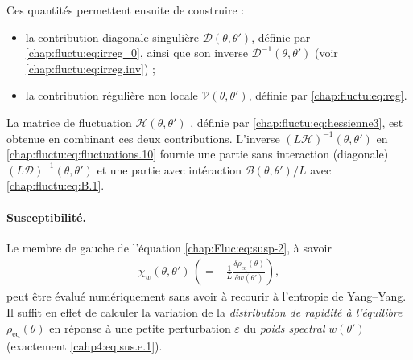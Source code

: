 Ces quantités permettent ensuite de construire :
\begin{itemize}[label = $\bullet$]
	\item la contribution diagonale singulière \( \mathcal{D}(\theta, \theta') \), définie par \eqref{chap:fluctu:eq:irreg_0}, ainsi que son inverse \( \mathcal{D}^{-1}(\theta, \theta') \) (voir \eqref{chap:fluctu:eq:irreg.inv}) ;	
	\item la contribution régulière non locale \( \mathcal{V}(\theta, \theta') \), définie par \eqref{chap:fluctu:eq:reg}.
\end{itemize}

La matrice de fluctuation \( \mathcal{H}(\theta, \theta') \)  , définie par \eqref{chap:fluctu:eq:hessienne3}, est obtenue en combinant ces deux contributions. L’inverse \( \left(L \mathcal{H} \right)^{-1}(\theta, \theta') \) en \eqref{chap:fluctu:eq:fluctuations.10} fournie une partie sans interaction (diagonale) $(L\mathcal{D})^{-1}(\theta, \theta')$ et une partie avec intéraction $\mathcal{B}(\theta, \theta')/L$ avec \eqref{chap:fluctu:eq:B.1}.


%

\paragraph{Susceptibilité.}

Le membre de gauche de l’équation \eqref{chap:Fluc:eq:susp-2}, à savoir
\begin{eqnarray*}
\chi_w(\theta, \theta') \, \left ( =  - \frac{1}{L} \frac{\delta \rho_{\mathrm{eq}}(\theta)}{\delta w(\theta')} \right ) ,
\end{eqnarray*}
peut être évalué numériquement sans avoir à recourir à l'entropie de Yang–Yang. Il suffit en effet de calculer la variation de la {\em distribution de rapidité à l'équilibre} $\rho_{\mathrm{eq}}(\theta)$ en réponse à une petite perturbation $\varepsilon$  du {\em poids spectral} $w(\theta')$ (exactement \eqref{cahp4:eq.sus.e.1}).



